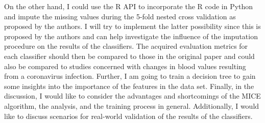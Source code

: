 \documentclass[12pt,a4paper,oneside]{article}
\newcommand{\comment}[1]{}
\begin{document}
On the other hand, I could use the R API to incorporate the R code in Python and impute the missing values during the 5-fold nested cross validation as proposed by the authors. I will try to implement the latter possibility since this is proposed by the authors and can help investigate the influence of the imputation procedure on the results of the classifiers.
The acquired evaluation metrics for each classifier should then be compared to those in the original paper and could also be compared to studies concerned with changes in blood values resulting from a coronavirus infection. Further, I am going to train a decision tree to gain some insights into the importance of the features in the data set. Finally, in the discussion, I would like to consider the advantages and shortcomings of the MICE algorithm, the analysis, and the training process in general. Additionally, I would like to discuss scenarios for real-world validation of the results of the classifiers.
\comment{
Additionally, I could discuss further ideas, such as the potential benefits and pitfalls in bootstrapping data using the original data set to improve the performance of the classifiers and scenarios for a real-world validation of the results.}
\printbibliography
\end{document}
